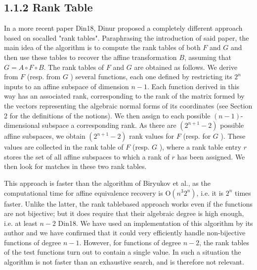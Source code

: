 \documentclass[10pt]{article}
\begin{document}
\subsection*{1.1.2 Rank Table}
In a more recent paper Din18, Dinur proposed a completely different approach based on socalled "rank tables". Paraphrasing the introduction of said paper, the main idea of the algorithm is to compute the rank tables of both $F$ and $G$ and then use these tables to recover the affine transformation $B$, assuming that $G=A \circ F \circ B$. The rank tables of $F$ and $G$ are obtained as follows. We derive from $F$ (resp. from $G$ ) several functions, each one defined by restricting its $2^{n}$ inputs to an affine subspace of dimension $n-1$. Each function derived in this way has an associated rank, corresponding to the rank of the matrix formed by the vectors representing the algebraic normal forms of its coordinates (see Section 2 for the definitions of the notions). We then assign to each possible $(n-1)$-dimensional subspace a corresponding rank. As there are $\left(2^{n+1}-2\right)$ possible affine subspaces, we obtain $\left(2^{n+1}-2\right)$ rank values for $F$ (resp. for $G$ ). These values are collected in the rank table of $F$ (resp. $G$ ), where a rank table entry $r$ stores the set of all affine subspaces to which a rank of $r$ has been assigned. We then look for matches in these two rank tables.

This approach is faster than the algorithm of Biryukov et al., as the computational time for affine equivalence recovery is $\mathrm{O}\left(n^{3} 2^{n}\right)$, i.e. it is $2^{n}$ times faster. Unlike the latter, the rank tablebased approach works even if the functions are not bijective; but it does require that their algebraic degree is high enough, i.e. at least $n-2$ Din18. We have used an implementation of this algorithm by its author and we have confirmed that it could very efficiently handle non-bijective functions of degree $n-1$. However, for functions of degree $n-2$, the rank tables of the test functions turn out to contain a single value. In such a situation the algorithm is not faster than an exhaustive search, and is therefore not relevant.
\end{document}
